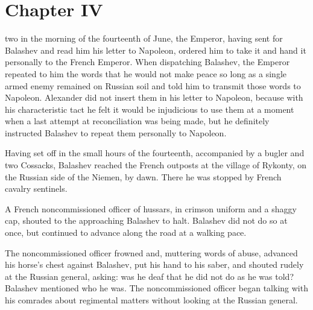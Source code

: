 
\chapter*{Chapter IV}
\ifaudio     
{} 
\fi

 two in the morning of the fourteenth of June, the Emperor,
having sent for Balashev and read him his letter to Napoleon,
ordered him to take it and hand it personally to the French
Emperor. When dispatching Balashev, the Emperor repeated to him
the words that he would not make peace so long as a single armed
enemy remained on Russian soil and told him to transmit those
words to Napoleon. Alexander did not insert them in his letter to
Napoleon, because with his characteristic tact he felt it would
be injudicious to use them at a moment when a last attempt at
reconciliation was being made, but he definitely instructed
Balashev to repeat them personally to Napoleon.

Having set off in the small hours of the fourteenth, accompanied
by a bugler and two Cossacks, Balashev reached the French
outposts at the village of Rykonty, on the Russian side of the
Niemen, by dawn. There he was stopped by French cavalry
sentinels.

A French noncommissioned officer of hussars, in crimson uniform
and a shaggy cap, shouted to the approaching Balashev to
halt. Balashev did not do so at once, but continued to advance
along the road at a walking pace.

The noncommissioned officer frowned and, muttering words of
abuse, advanced his horse's chest against Balashev, put his hand
to his saber, and shouted rudely at the Russian general, asking:
was he deaf that he did not do as he was told? Balashev mentioned
who he was. The noncommissioned officer began talking with his
comrades about regimental matters without looking at the Russian
general.

